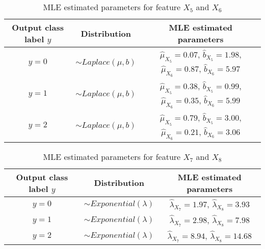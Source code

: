 \documentclass[12pt, a4paper, twoside]{article}
\begin{document}
{
	\renewcommand{\arraystretch}{2}
	\begin{table}[p]
		\begin{center}
			\begin{tabular}{c c c}
				\hline
				Output class label $y$ & Distribution & MLE estimated parameters  \\ \hline
				$y = 0$& $\sim Laplace(\mu, b)$& $\hat{\mu}_{X_5} = 0.07$, $\hat{b}_{X_5} =1.98 $, $\hat{\mu}_{X_6} = 0.87 $, $\hat{b}_{X_6} = 5.97$ \\ \hline
				$y = 1$& $\sim Laplace(\mu, b)$& $\hat{\mu}_{X_5} = 0.38$, $\hat{b}_{X_5} = 0.99 $, $\hat{\mu}_{X_6} = 0.35 $, $\hat{b}_{X_6} = 5.99$ \\ \hline
				$y = 2$& $\sim Laplace(\mu, b)$& $\hat{\mu}_{X_5} = 0.79$, $\hat{b}_{X_5} = 3.00 $, $\hat{\mu}_{X_6} = 0.21 $, $\hat{b}_{X_6} = 3.06$ \\ \hline
				
			\end{tabular}
			\caption{MLE estimated parameters for feature $X_5$ and $X_6$}\label{T:lap}
		\end{center}
	\end{table}
}
{
	\renewcommand{\arraystretch}{2}
	\begin{table}[p]
		\begin{center}
			\begin{tabular}{c c c}
				\hline
				Output class label $y$ & Distribution & MLE estimated parameters \\ \hline
				$y = 0$&  $\sim Exponential(\lambda)$& $\hat{\lambda}_{X_7} = 1.97 $, $\hat{\lambda}_{X_8} =3.93 $ \\ \hline
				$y = 1$&  $\sim Exponential(\lambda)$& $\hat{\lambda}_{X_7} =2.98 $, $\hat{\lambda}_{X_8} =7.98 $ \\ \hline
				$y = 2$&  $\sim Exponential(\lambda)$& $\hat{\lambda}_{X_7} =8.94 $, $\hat{\lambda}_{X_8} =14.68 $ \\ \hline
			\end{tabular}
			\caption{MLE estimated parameters for feature $X_7$ and $X_8$}\label{T:lam}
		\end{center}
	\end{table}
}
\end{document}
